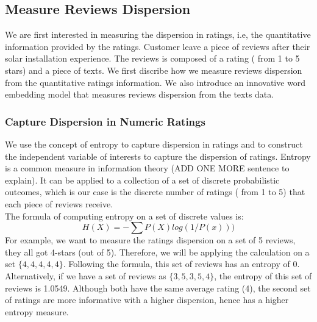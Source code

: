 \documentclass[msom,blindrev]{informs3}
\begin{document}
\subsection{Measure Reviews Dispersion}
\label{subsection_measure_dispersion}
We are first interested in measuring the dispersion in ratings, i.e, the quantitative information provided by the ratings. Customer leave a piece of reviews after their solar installation experience. The reviews is composed of a rating ( from 1 to 5 stars) and a piece of texts. We first discribe how we measure reviews dispersion from the quantitative ratings information. We also introduce an innovative word embedding model that measures reviews dispersion from the texts data.
\subsubsection{Capture Dispersion in Numeric Ratings}
We use the concept of entropy to capture dispersion in ratings and to construct the independent variable of interests to capture the dispersion of ratings. Entropy is a common measure in information theory (ADD ONE MORE sentence to explain). It can be applied to a collection of a set of discrete probabilistic outcomes, which is our case is the discrete number of ratings ( from 1 to 5) that each piece of reviews receive. \\
The formula of computing entropy on a set of discrete values is:  \\
\begin{equation}
H(X)=-\sum P(X)log(1/P(x)))
\end{equation}
For example, we want to measure the ratings dispersion on a set of 5 reviews, they all got 4-stars (out of 5). Therefore, we will be applying the calculation on a set $\{4,4,4,4,4\}$. Following the formula, this set of reviews has an entropy of 0. Alternatively, if we have a set of reviews as $\{3,5,3,5,4\}$, the entropy of this set of reviews is 1.0549.  Although both have the same average rating (4), the second set of ratings are more informative with a higher dispersion, hence has a higher entropy measure. \\
\end{document}
